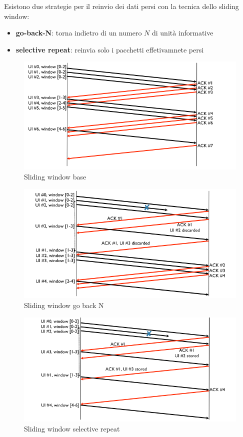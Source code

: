 Esistono due strategie per il reinvio dei dati persi con la tecnica dello sliding window:
\begin{itemize}
  \item \textbf{go-back-N}: torna indietro di un numero $N$ di unità informative
  \item \textbf{selective repeat}: reinvia solo i pacchetti effetivamnete persi
\end{itemize}

\begin{figure}[!ht]
	\centering
	\includegraphics[width=0.4\columnwidth]{./images/sliding_window_base.png}
  \caption{Sliding window base}
  \label{fig:sliding_window_base}
\end{figure}


\begin{figure}[!ht]
	\centering
	\includegraphics[width=0.4\columnwidth]{./images/sliding_window_go_back_n.png}
  \caption{Sliding window go back N}
  \label{fig:sliding_window_go_back_n}
\end{figure}

\begin{figure}[!ht]
	\centering
	\includegraphics[width=0.4\columnwidth]{./images/sliding_window_selective_repeat.png}
  \caption{Sliding window selective repeat}
  \label{fig:sliding_window_selective_repeat}
\end{figure}



